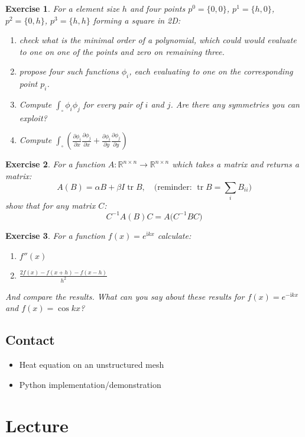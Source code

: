 \documentclass{article}
\DeclareMathOperator{\tr}{tr}
\newcommand{\rr}[2]{\frac{\partial #1}{\partial #2}}
\newtheorem{exercise}{Exercise}[section]
\begin{document}
\begin{exercise}
For a element size $h$ and four points $p^0=\{0,0\}$, $p^1=\{h,0\}$, $p^2=\{0,h\}$, $p^3=\{h,h\}$ forming a square in 2D:
\begin{enumerate}[label=\alph*)]
\item check what is the minimal order of a polynomial, which could would evaluate to one on one of the points and zero on remaining three.
\item propose four such functions $\phi_i$, each evaluating to one on the corresponding point $p_i$.
\item Compute $\int_\square\phi_i\phi_j$ for every pair of $i$ and $j$. Are there any symmetries you can exploit?
\item Compute $\int_\square \left(\rr{\phi_i}{x}\rr{\phi_j}{x} + \rr{\phi_i}{y}\rr{\phi_j}{y}\right)$
\end{enumerate}
\end{exercise}

\begin{exercise}
For a function $A:\mathbb{R}^{n\times n}\rightarrow\mathbb{R}^{n\times n}$ which takes a matrix and returns a matrix:
\[A(B) = \alpha B + \beta I \tr{B},\quad\text{(reminder: $\tr{B}=\sum_iB_{ii}$)}\]
show that for any matrix $C$:
\[C^{-1}A(B)C = A\big(C^{-1}BC\big)\]
\end{exercise}

\begin{exercise}
For a function $f(x) = e^{\mathrm{i}kx}$ calculate:
\begin{enumerate}[label=\alph*)]
\item $f''(x)$
\item $\frac{2f(x)-f(x+h)-f(x-h)}{h^2}$
\end{enumerate}
And compare the results. What can you say about these results for $f(x) = e^{-\mathrm{i}kx}$ and $f(x) = \cos{kx}$?
\end{exercise}


\subsection*{Contact}
\begin{itemize}
    \item Heat equation on an unstructured mesh
    \item Python implementation/demonstration
\end{itemize}


\section{Lecture}
\end{document}
